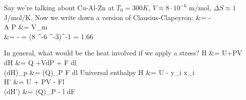 \documentclass[12pt]{article}
\begin{document}
Say we're talking about Cu-Al-Zn at $T_0 = 300K$, $V \approx 8 \cdot 10^{-6}$ m\three/mol, $\Delta S \approx 1$ J/mol/K.  Now we write down a version of Clausius-Clapeyron:
\eqs
{}  &= -\\
A \Delta P &= V_m \Delta \epsilon\\
 &= - = (8 ^-6  ^{-3})^{-1} = 1.66 
\eqe

In general, what would be the heat involved if we apply a stress?
\eqs
H &= U+PV\\
dH &= \partial Q +VdP + F dl\\
(dH)_p &= (\partial Q)_P F dl
\eqe
Universal enthalpy
\eqs
H &= U - \sum y_i x_i\\
H' &= U + PV - Fl\\
(dH') &= (\partial Q)_P - l dF
\eqe
%
\end{document}
